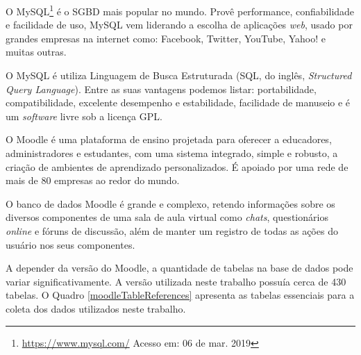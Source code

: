 O MySQL\footnote{\url{https://www.mysql.com/} Acesso em: 06 de mar. 2019} é o SGBD
mais popular no mundo. Provê performance, confiabilidade e facilidade de uso,
MySQL vem liderando a escolha de aplicações \textit{web}, usado por grandes
empresas na internet como: Facebook, Twitter, YouTube, Yahoo! e muitas outras.

O MySQL é utiliza Linguagem de Busca Estruturada (SQL, do inglês,
\textit{Structured Query Language}). Entre as suas vantagens podemos
listar: portabilidade, compatibilidade, excelente desempenho e estabilidade,
facilidade de manuseio e é um \textit{software} livre sob a licença GPL.

O Moodle é uma plataforma de ensino projetada para oferecer a educadores,
administradores e estudantes, com uma sistema integrado, simple e robusto, a
criação de ambientes de aprendizado personalizados. É apoiado por uma rede de
mais de 80 empresas ao redor do mundo.

O banco de dados Moodle é grande e complexo, retendo informações sobre os
diversos componentes de uma sala de aula virtual como \textit{chats},
questionários \textit{online} e fóruns de discussão, além de manter um registro de
todas as ações do usuário nos seus componentes.

A depender da versão do Moodle, a quantidade de tabelas na base de dados pode
variar significativamente. A versão utilizada neste trabalho possuía cerca de
430 tabelas. O Quadro \ref{moodleTableReferences} apresenta as tabelas
essenciais para a coleta dos dados utilizados neste trabalho.

